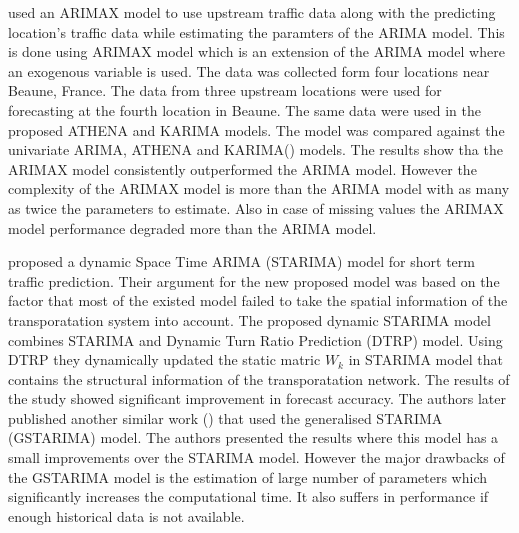 \citet{williams2001multivariate} used an ARIMAX model to use upstream traffic data along with the
predicting location's traffic data while estimating the paramters of the ARIMA model. This is
done using ARIMAX model which is an extension of the ARIMA model where an exogenous variable is
used. The data was collected form four locations near Beaune, France. The data from three upstream
locations were used for forecasting at the fourth location in Beaune. The same data were used
in the proposed ATHENA and KARIMA models. The model was compared  against the univariate ARIMA,
ATHENA\citet{danech1991athena} and KARIMA(\citet{van1996combining}) models. The results show tha
the ARIMAX model consistently outperformed the ARIMA model. However the complexity of the ARIMAX
model is more than the ARIMA model with as many as twice the parameters to estimate. Also in case
of missing values the ARIMAX model performance degraded more than the ARIMA model.

\citet{min2009short} proposed a dynamic Space Time ARIMA (STARIMA) model for short term traffic
prediction. Their argument for the new proposed model was based on the factor that most of the
existed model failed to take the spatial information of the transporatation system into account.
The proposed dynamic STARIMA model combines STARIMA and Dynamic Turn Ratio Prediction (DTRP)
model. Using DTRP they dynamically updated the static matric $W_{k}$ in STARIMA model that contains
the structural information of the transporatation network. The results of the study showed
significant improvement in forecast accuracy. The authors later published another similar work
(\citet{min2010urban}) that used the generalised STARIMA (GSTARIMA) model.  The authors
presented the results where this model has a small improvements over the STARIMA model. However
the major drawbacks of the GSTARIMA model is the estimation of large number of parameters which
significantly increases the computational time. It also suffers in performance if enough historical
data is not available.

